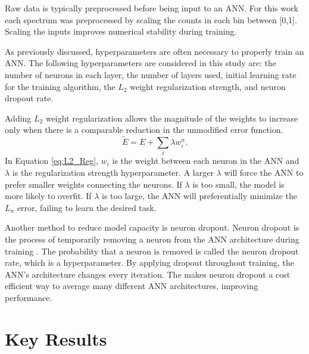 \documentclass[thesis,tocnosub,noragright,centerchapter,12pt,fullpage]{uiucecethesis09}
\begin{document}
Raw data is typically preprocessed before being input to an ANN. For this work each spectrum was preprocessed by scaling the counts in each bin between [0,1]. Scaling the inputs improves numerical stability during training. 

As previously discussed, hyperparameters are often necessary to properly train an ANN. The following hyperparameters are considered in this study are: the number of neurons in each layer, the number of layers used, initial learning rate for the training algorithm, the $L_2$ weight regularization strength, and neuron dropout rate. 

Adding $L_2$ weight regularization allows the magnitude of the weights to increase only when there is a comparable reduction in the unmodified error function.
%
\begin{equation} \label{eq:L2_Reg}
\tilde{E} = E + \sum_i \lambda w_i^n.
\end{equation}
%
In Equation \ref{eq:L2_Reg}, $w_i$ is the weight between each neuron in the ANN and $\lambda$ is the regularization strength hyperparameter. A larger $\lambda$ will force the ANN to prefer smaller weights connecting the neurons. If $\lambda$ is too small, the model is more likely to overfit. If $\lambda$ is too large, the ANN will preferentially minimize the $L_n$ error, failing to learn the desired task.

Another method to reduce model capacity is neuron dropout. Neuron dropout is the process of temporarily removing a neuron from the ANN architecture during training \cite{Srivastava2014}. The probability that a neuron is removed is called the neuron dropout rate, which is a hyperparameter. By applying dropout throughout training, the ANN's architecture changes every iteration. The makes neuron dropout a cost efficient way to average many different ANN architectures, improving performance.



\section{Key Results}




\end{document}

